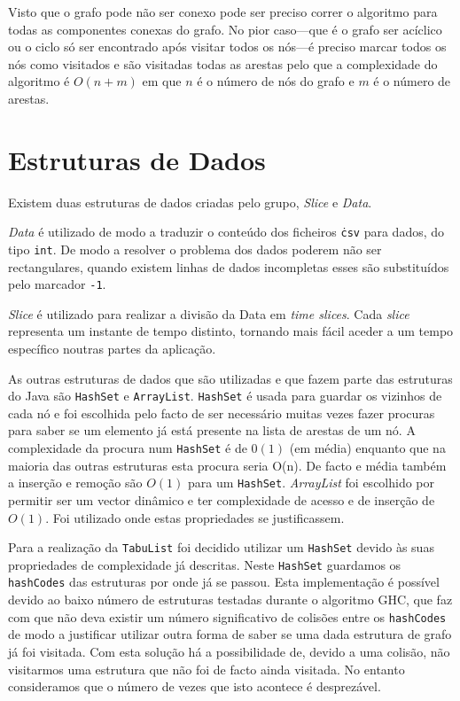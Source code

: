 \documentclass[a4paper]{article}
\begin{document}
      Visto que o grafo pode não ser conexo pode ser preciso correr o algoritmo para todas as componentes conexas do grafo. No pior caso---que é o grafo ser acíclico ou o ciclo só ser encontrado após visitar todos os nós---é preciso marcar todos os nós como visitados e são visitadas todas as arestas pelo que a complexidade do algoritmo é $O(n+m)$ em que $n$ é o número de nós do grafo e $m$ é o número de arestas.



      \section{Estruturas de Dados}
	  Existem duas estruturas de dados criadas pelo grupo, \textit{Slice} e \textit{Data}.
      
      \textit{Data} é utilizado de modo a traduzir o conteúdo dos ficheiros \texttt{\.csv} para dados, do tipo \texttt{int}. De modo a resolver o problema dos dados poderem não ser rectangulares, quando existem linhas de dados incompletas esses são substituídos pelo marcador \texttt{-1}.
      
      \textit{Slice} é utilizado para realizar a divisão da Data em \textit{time slices}. Cada \textit{slice} representa um instante de tempo distinto, tornando mais fácil aceder a um tempo específico noutras partes da aplicação.
      
      As outras estruturas de dados que são utilizadas e que fazem parte das estruturas do Java são \texttt{HashSet} e \texttt{ArrayList}. \texttt{HashSet} é usada para guardar os vizinhos de cada nó e foi escolhida pelo facto de ser necessário muitas vezes fazer procuras para saber se um elemento já está presente na lista de arestas de um nó. A complexidade da procura num \texttt{HashSet} é de $0(1)$ (em média) enquanto que na maioria das outras estruturas esta procura seria O(n). De facto e média também a inserção e remoção são $O(1)$ para um \texttt{HashSet}.
      \textit{ArrayList} foi escolhido por permitir ser um vector dinâmico e ter complexidade de acesso e de inserção de $O(1)$. Foi utilizado onde estas propriedades se justificassem.

	  Para a realização da \texttt{TabuList} foi decidido utilizar um \texttt{HashSet} devido às suas propriedades de complexidade já descritas. Neste \texttt{HashSet} guardamos os \texttt{hashCodes} das estruturas por onde já se passou. Esta implementação é possível devido ao baixo número de estruturas testadas durante o algoritmo GHC, que faz com que não deva existir um número significativo de colisões entre os \texttt{hashCodes} de modo a justificar utilizar outra forma de saber se uma dada estrutura de grafo já foi visitada. Com esta solução há a possibilidade de, devido a uma colisão, não visitarmos uma estrutura que não foi de facto ainda visitada. No entanto consideramos que o número de vezes que isto acontece é desprezável.
      
\end{document}
